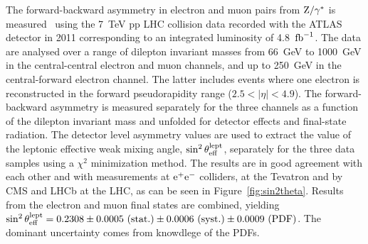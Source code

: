 \documentclass{blois}
\begin{document}
The forward-backward asymmetry in electron and muon pairs from ${\rm Z}/\gamma^*$
is measured~\cite{ref:ATLAS-fb-asymmetry} using the 7~TeV pp LHC collision data
recorded with the ATLAS detector in 2011 corresponding to an integrated luminosity
of 4.8~${\rm fb}^{-1}$. The data are analysed over a range of dilepton invariant
masses from 66~GeV to 1000~GeV in the central-central electron and muon channels,
and up to 250~GeV in the central-forward electron channel. The latter includes
events where one electron is reconstructed in the forward pseudorapidity range
($2.5 < |\eta| < 4.9$). The forward-backward asymmetry is measured separately
for the three channels as a function of the dilepton invariant mass and unfolded
for detector effects and final-state radiation. The detector level asymmetry
values are used to extract the value of the leptonic effective weak mixing angle,
$\sin^2\theta_{\rm eff}^{\rm lept}$, separately for the three data samples using
a $\chi^2$ minimization method. The results are in good agreement with each other
and with measurements at ${\rm e}^+{\rm e}^-$ colliders, at the Tevatron and by
CMS and LHCb at the LHC, as can be seen in Figure~\ref{fig:sin2theta}. Results
from the electron and muon final states are combined, yielding
$\sin^2\theta_{\rm eff}^{\rm lept} = 0.2308 \pm 0.0005~({\rm stat.}) \pm 0.0006~({\rm syst.}) \pm 0.0009~({\rm PDF})$.
The dominant uncertainty comes from knowdlege of the PDFs.
%
\end{document}
